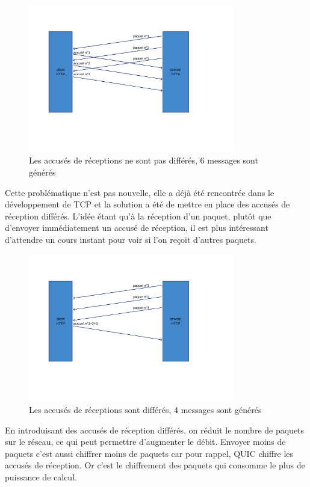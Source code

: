 \begin{figure}[H]
    \centering
    \includegraphics[width=0.8\textwidth]{figures/ack_not_delayed.png}
    \caption{Les accusés de réceptions ne sont pas différés, 6 messages sont générés}
\end{figure}

Cette problématique n'est pas nouvelle, elle a déjà été rencontrée dans le développement de TCP et la solution a été de mettre en place des accusés de réception différés. L'idée étant qu'à la réception d'un paquet, plutôt que d'envoyer immédiatement un accusé de réception, il est plus intéressant d'attendre un cours instant pour voir si l'on reçoit d'autres paquets.

\begin{figure}[H]
    \centering
    \includegraphics[width=0.8\textwidth]{figures/ack_delayed.png}
    \caption{Les accusés de réceptions sont différés, 4 messages sont générés}
\end{figure}

En introduisant des accusés de réception différés, on réduit le nombre de paquets sur le réseau, ce qui peut permettre d'augmenter le débit. Envoyer moins de paquets c'est aussi chiffrer moins de paquets car pour rappel, QUIC chiffre les accusés de réception. Or c'est le chiffrement des paquets qui consomme le plus de puissance de calcul.

